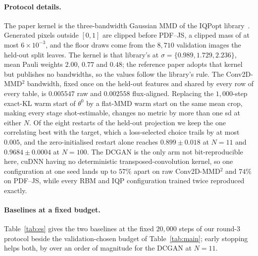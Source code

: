 \documentclass{article}
\begin{document}
\paragraph{Protocol details.} The paper kernel is the three-bandwidth Gaussian MMD of the IQPopt
library~\cite{recio_2025_iqpopt}. Generated pixels outside $[0,1]$ are clipped before PDF--JS, a
clipped mass of at most $6\times10^{-3}$, and the floor draws come from the $8{,}710$ validation
images the held-out split leaves. The kernel is that library's at
$\sigma = \{0.989, 1.729, 2.236\}$, mean Pauli weights $2.00$,
$0.77$ and $0.48$; the reference paper adopts that kernel but publishes no bandwidths, so the values
follow the library's rule. The Conv2D-MMD$^2$ bandwidth, fixed once on the held-out features and
shared by every row of every table, is $0.005547$ raw and $0.002558$ flux-aligned. Replacing the
$1{,}000$-step exact-KL warm start of $\theta^{0}$ by a flat-MMD warm start on the same mean crop,
making every stage shot-estimable, changes no metric by more than one sd at either $N$. Of the eight
restarts of the held-out projection we keep the one correlating best with the target, which a
loss-selected choice trails by at most $0.005$, and the zero-initialised restart alone reaches
$0.899 \pm 0.018$ at $N{=}11$ and $0.9684 \pm 0.0004$ at $N{=}100$. The DCGAN is the only arm not bit-reproducible here,
cuDNN having no deterministic transposed-convolution kernel, so one configuration at one seed lands
up to $57\%$ apart on raw Conv2D-MMD$^2$ and $74\%$ on PDF--JS, while every RBM and IQP configuration
trained twice reproduced exactly.

\paragraph{Baselines at a fixed budget.} Table~\ref{tab:es} gives the two baselines at the fixed
$20{,}000$ steps of our round-3 protocol beside the validation-chosen budget of Table~\ref{tab:main};
early stopping helps both, by over an order of magnitude for the DCGAN at $N{=}11$.
\end{document}
